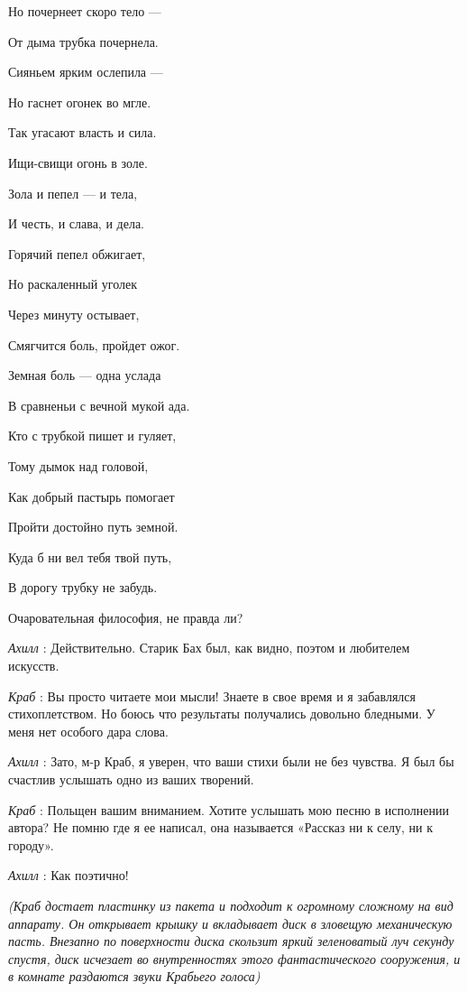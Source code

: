 \documentclass[../main.tex]{subfiles}
\begin{document}
\begin{dialogue}
Но почернеет скоро тело ---

От дыма трубка почернела.

Сияньем ярким ослепила ---

Но гаснет огонек во мгле.

Так угасают власть и сила.

Ищи-свищи огонь в золе.

Зола и пепел --- и тела,

И честь, и слава, и дела.

Горячий пепел обжигает,

Но раскаленный уголек

Через минуту остывает,

Смягчится боль, пройдет ожог.

Земная боль --- одна услада

В сравненьи с вечной мукой ада.

Кто с трубкой пишет и гуляет,

Тому дымок над головой,

Как добрый пастырь помогает

Пройти достойно путь земной.

Куда б ни вел тебя твой путь,

В дорогу трубку не забудь.

Очаровательная философия, не правда ли?

\emph{Ахилл} : Действительно. Старик Бах был, как видно, поэтом и любителем искусств.

\emph{Краб} : Вы просто читаете мои мысли! Знаете в свое время и я забавлялся стихоплетством. Но боюсь что результаты получались довольно бледными. У меня нет особого дара слова.

\emph{Ахилл} : Зато, м-р Краб, я уверен, что ваши стихи были не без чувства. Я был бы счастлив услышать одно из ваших творений.

\emph{Краб} : Польщен вашим вниманием. Хотите услышать мою песню в исполнении автора? Не помню где я ее написал, она называется «Рассказ ни к селу, ни к городу».

\emph{Ахилл} : Как поэтично!

\emph{(Краб достает пластинку из пакета и подходит к огромному сложному на вид аппарату. Он открывает крышку и вкладывает диск в зловещую механическую пасть. Внезапно по поверхности диска скользит яркий зеленоватый луч секунду спустя, диск исчезает во внутренностях этого фантастического сооружения, и в комнате раздаются звуки Крабьего голоса)}


\end{dialogue}
\end{document}
